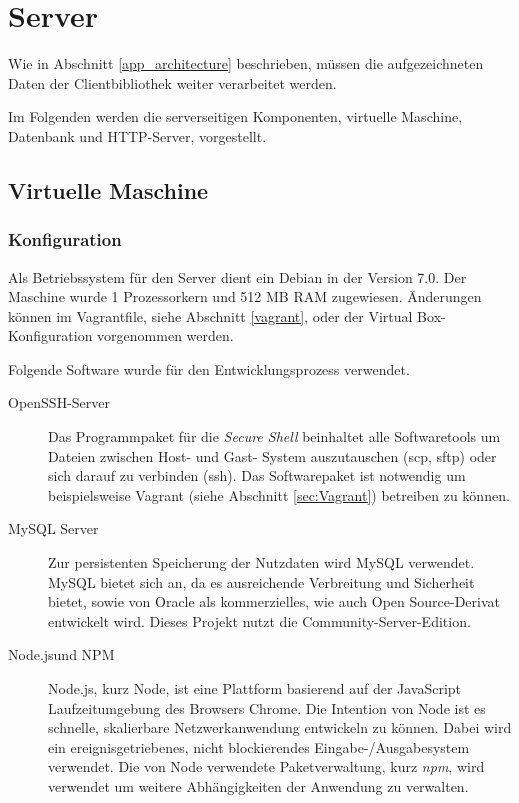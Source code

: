 \section{Server}
\label{server}
Wie in Abschnitt \ref{app_architecture} beschrieben, müssen die aufgezeichneten Daten der Clientbibliothek weiter verarbeitet werden. %

Im Folgenden werden die serverseitigen Komponenten, virtuelle Maschine, Datenbank und \ac{HTTP}-Server, vorgestellt. 



\subsection{Virtuelle Maschine}

\subsubsection{Konfiguration \label{sec:vm-config}}

Als Betriebssystem für den Server dient ein Debian in der Version 7.0. Der Maschine wurde 1 Prozessorkern und 512 MB RAM zugewiesen. Änderungen können im Vagrantfile, siehe Abschnitt \ref{vagrant}, oder der Virtual Box-Konfiguration vorgenommen werden. 

Folgende Software wurde für den Entwicklungsprozess verwendet. 
\begin{description}
	\item[OpenSSH-Server\footnotemark] 
	Das Programmpaket für die \emph{Secure Shell} beinhaltet alle Softwaretools um Dateien zwischen Host- und Gast- System auszutauschen (scp, sftp) oder sich darauf zu verbinden (ssh). 
	Das Softwarepaket ist notwendig um beispielsweise Vagrant (siehe Abschnitt \ref{sec:Vagrant}) betreiben zu können. 

	\item[MySQL Server\footnotemark]
	Zur persistenten Speicherung der Nutzdaten wird MySQL verwendet. MySQL bietet sich an, da es ausreichende Verbreitung und Sicherheit bietet, sowie von Oracle als kommerzielles, wie auch Open Source-Derivat entwickelt wird. Dieses Projekt nutzt die Community-Server-Edition.
	
	\item[Node.js\footnotemark und NPM\footnotemark]
	Node.js, kurz Node, ist eine Plattform basierend auf der JavaScript Laufzeitumgebung des Browsers Chrome. 
	Die Intention von Node ist es schnelle, skalierbare Netzwerkanwendung entwickeln zu können.
	Dabei wird ein ereignisgetriebenes, nicht blockierendes Eingabe-/Ausgabesystem verwendet.
	Die von Node verwendete Paketverwaltung, kurz \emph{npm}, wird verwendet um weitere Abhängigkeiten der Anwendung zu verwalten.
	
\end{description}

